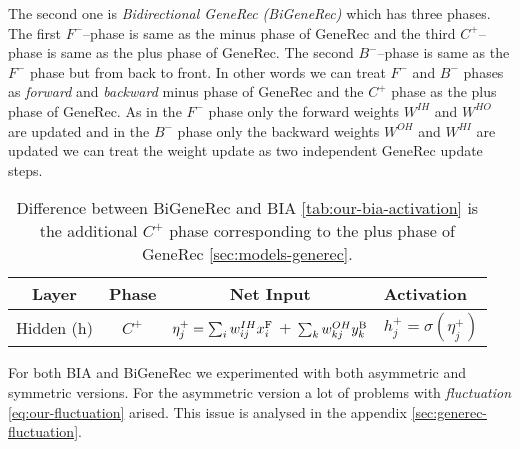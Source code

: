 The second one is \emph{Bidirectional GeneRec (BiGeneRec)} which has three phases. The first $F^{-}$--phase is same as the minus phase of GeneRec and the third $C^{+}$--phase is same as the plus phase of GeneRec. The second $B^{-}$--phase is same as the $F^{-}$ phase but from back to front. In other words we can treat $F^{-}$ and $B^{-}$ phases as \emph{forward} and \emph{backward} minus phase of GeneRec and the $C^{+}$ phase as the plus phase of GeneRec. As in the $F^{-}$ phase only the forward weights $W^{IH}$ and $W^{HO}$ are updated and in the $B^{-}$ phase only the backward weights $W^{OH}$ and $W^{HI}$ are updated we can treat the weight update as two independent GeneRec update steps. 

\begin{table}[H] 
  \centering
  \begin{tabular}{|cccl|}
    \hline
    Layer & Phase & Net Input & Activation\\
    \hline
    Hidden (h)   &  $C^{+}$  & $\eta^{+}_j = \sum_{i}w_{ij}^{IH}x^{\rm F}_i$ + $\sum_k w_{kj}^{OH}y^{\rm B}_k$ & $h^{+}_{j} = \sigma(\eta^{+}_j)$ \\
    \hline
  \end{tabular}
  \caption{Difference between BiGeneRec and BIA \ref{tab:our-bia-activation} is the additional $C^{+}$ phase corresponding to the plus phase of GeneRec \ref{sec:models-generec}.} 
  \label{tab:our-bigenerec-activation}
\end{table} 

For both BIA and BiGeneRec we experimented with both asymmetric and symmetric versions. For the asymmetric version a lot of problems with \emph{fluctuation} \ref{eq:our-fluctuation} arised. This issue is analysed in the appendix \ref{sec:generec-fluctuation}. 

